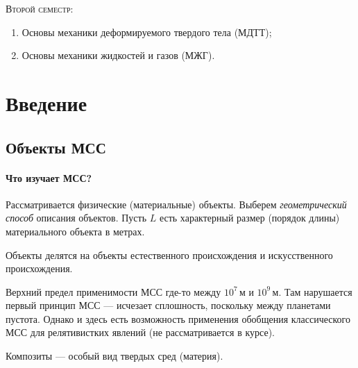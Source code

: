 \textsc{Второй семестр}:
\begin{enumerate}
  \item Основы механики деформируемого твердого тела (МДТТ);
  \item Основы механики жидкостей и газов (МЖГ).
\end{enumerate}



\section{Введение}
\subsection{Объекты МСС}
\paragraph{Что изучает МСС?}
Рассматривается физические (материальные) объекты. Выберем \textsl{геометрический способ}
описания объектов. Пусть $ L $ есть характерный размер (порядок длины) материального
объекта в метрах.
    
	\begin{figure}[H]
		\centering
		
	\end{figure}
    
    Объекты делятся на 
объекты естественного происхождения и искусственного происхождения.

    Верхний предел применимости МСС где-то между $10^7$\,м и $10^9$\,м. Там нарушается первый принцип
    МСС --- исчезает сплошность, поскольку между планетами пустота. Однако и
    здесь есть возможность применения обобщения классического МСС для
    релятивистких явлений (не рассматривается в курсе).

    Композиты --- особый вид твердых сред (материя).


